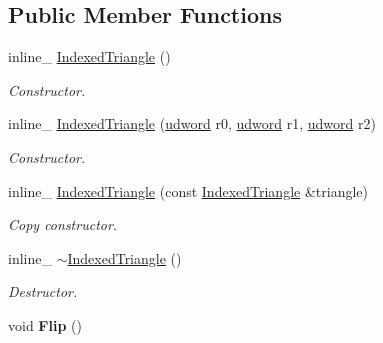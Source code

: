 \subsection*{Public Member Functions}
\begin{DoxyCompactItemize}
\item 
inline\+\_\+ \hyperlink{classIndexedTriangle_ac90c80ffc51dfa77d1bd9ca619cece86}{Indexed\+Triangle} ()\hypertarget{classIndexedTriangle_ac90c80ffc51dfa77d1bd9ca619cece86}{}\label{classIndexedTriangle_ac90c80ffc51dfa77d1bd9ca619cece86}

\begin{DoxyCompactList}\small\item\em Constructor. \end{DoxyCompactList}\item 
inline\+\_\+ \hyperlink{classIndexedTriangle_a220b47bc4a43331b97cb40568f3e6943}{Indexed\+Triangle} (\hyperlink{IceTypes_8h_a44c6f1920ba5551225fb534f9d1a1733}{udword} r0, \hyperlink{IceTypes_8h_a44c6f1920ba5551225fb534f9d1a1733}{udword} r1, \hyperlink{IceTypes_8h_a44c6f1920ba5551225fb534f9d1a1733}{udword} r2)\hypertarget{classIndexedTriangle_a220b47bc4a43331b97cb40568f3e6943}{}\label{classIndexedTriangle_a220b47bc4a43331b97cb40568f3e6943}

\begin{DoxyCompactList}\small\item\em Constructor. \end{DoxyCompactList}\item 
inline\+\_\+ \hyperlink{classIndexedTriangle_a8353fbe1e859fd657fef6e53afbd6715}{Indexed\+Triangle} (const \hyperlink{classIndexedTriangle}{Indexed\+Triangle} \&triangle)\hypertarget{classIndexedTriangle_a8353fbe1e859fd657fef6e53afbd6715}{}\label{classIndexedTriangle_a8353fbe1e859fd657fef6e53afbd6715}

\begin{DoxyCompactList}\small\item\em Copy constructor. \end{DoxyCompactList}\item 
inline\+\_\+ \hyperlink{classIndexedTriangle_ac942c3fa7f0b31c0f8794f14f76afd3d}{$\sim$\+Indexed\+Triangle} ()\hypertarget{classIndexedTriangle_ac942c3fa7f0b31c0f8794f14f76afd3d}{}\label{classIndexedTriangle_ac942c3fa7f0b31c0f8794f14f76afd3d}

\begin{DoxyCompactList}\small\item\em Destructor. \end{DoxyCompactList}\item 
void {\bfseries Flip} ()\hypertarget{classIndexedTriangle_a1f62befd6484bee954f067d5738c38a5}{}\label{classIndexedTriangle_a1f62befd6484bee954f067d5738c38a5}


\end{DoxyCompactItemize}
